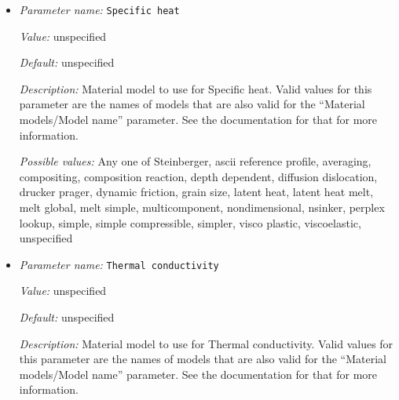 \begin{itemize}
{\it Default:} unspecified


{\it Description:} Material model to use for Reaction terms. Valid values for this parameter are the names of models that are also valid for the ``Material models/Model name'' parameter. See the documentation for that for more information.


{\it Possible values:} Any one of Steinberger, ascii reference profile, averaging, compositing, composition reaction, depth dependent, diffusion dislocation, drucker prager, dynamic friction, grain size, latent heat, latent heat melt, melt global, melt simple, multicomponent, nondimensional, nsinker, perplex lookup, simple, simple compressible, simpler, visco plastic, viscoelastic, unspecified
\item {\it Parameter name:} {\tt Specific heat}
\label{parameters:Material model/Compositing/Specific heat}
\label{parameters:Material_20model/Compositing/Specific_20heat}


{\it Value:} unspecified


{\it Default:} unspecified


{\it Description:} Material model to use for Specific heat. Valid values for this parameter are the names of models that are also valid for the ``Material models/Model name'' parameter. See the documentation for that for more information.


{\it Possible values:} Any one of Steinberger, ascii reference profile, averaging, compositing, composition reaction, depth dependent, diffusion dislocation, drucker prager, dynamic friction, grain size, latent heat, latent heat melt, melt global, melt simple, multicomponent, nondimensional, nsinker, perplex lookup, simple, simple compressible, simpler, visco plastic, viscoelastic, unspecified
\item {\it Parameter name:} {\tt Thermal conductivity}
\label{parameters:Material model/Compositing/Thermal conductivity}
\label{parameters:Material_20model/Compositing/Thermal_20conductivity}


{\it Value:} unspecified


{\it Default:} unspecified


{\it Description:} Material model to use for Thermal conductivity. Valid values for this parameter are the names of models that are also valid for the ``Material models/Model name'' parameter. See the documentation for that for more information.



\end{itemize}
